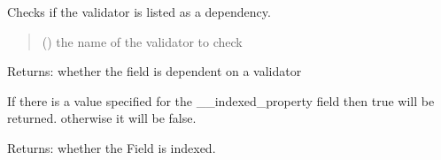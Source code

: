 \documentclass[letterpaper,10pt,english]{sphinxmanual}
\begin{document}
\begin{fulllineitems}
\begin{fulllineitems}
\begin{description}
\end{description}

\end{fulllineitems}


\begin{fulllineitems}
\label{\detokenize{apache_commons_validator_python:apache_commons_validator_python.field_new.Field.is_dependency}}
\pysigstartsignatures
{}
\pysigstopsignatures
\sphinxAtStartPar
Checks if the validator is listed as a dependency.
\begin{quote}\begin{description}
\sphinxAtStartPar
{} () \textendash{} the name of the validator to check

\end{description}\end{quote}

\sphinxAtStartPar
Returns: whether the field is dependent on a validator

\end{fulllineitems}


\begin{fulllineitems}
\label{\detokenize{apache_commons_validator_python:apache_commons_validator_python.field_new.Field.is_indexed}}
\pysigstartsignatures
{}
\pysigstopsignatures
\sphinxAtStartPar
If there is a value specified for the \_\_indexed\_property field then true will
be returned. otherwise it will be false.

\sphinxAtStartPar
Returns: whether the Field is indexed.

\end{fulllineitems}



\end{fulllineitems}
\end{document}
